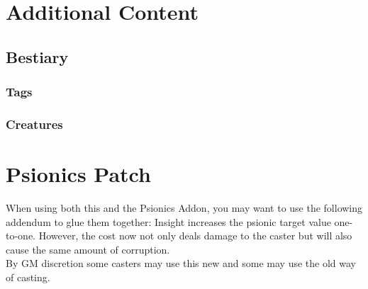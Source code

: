 \documentclass[12pt,a4paper,openany]{book}
\begin{document}
	\chapter{Additional Content}
	\section{Bestiary}
	\subsection{Tags}
	\subsection{Creatures}
	
	\chapter{Psionics Patch}
	When using both this and the Psionics Addon, you may want to use the following addendum to glue them together: 
	Insight increases the psionic target value one-to-one. However, the cost now not only deals damage to the caster but will also cause the same amount of corruption.\\
	By GM discretion some casters may use this new and some may use the old way of casting.
	
\end{document}
